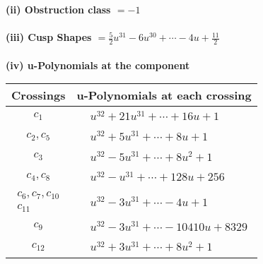 \documentclass[1p]{elsarticle_modified}
\theoremstyle{definition}
\begin{document}
\flushleft \textbf{(ii) Obstruction class $= -1$}\\~\\
\flushleft \textbf{(iii) Cusp Shapes $= \frac{5}{2} u^{31}-6 u^{30}+\cdots-4 u+\frac{11}{2}$}\\~\\
\newpage\renewcommand{\arraystretch}{1}
\flushleft \textbf{(iv) u-Polynomials at the component}\newline \\
\begin{tabular}{m{50pt}|m{274pt}}
Crossings & \hspace{64pt}u-Polynomials at each crossing \\
\hline $$\begin{aligned}c_{1}\end{aligned}$$&$\begin{aligned}
&u^{32}+21 u^{31}+\cdots+16 u+1
\end{aligned}$\\
\hline $$\begin{aligned}c_{2},c_{5}\end{aligned}$$&$\begin{aligned}
&u^{32}+5 u^{31}+\cdots+8 u+1
\end{aligned}$\\
\hline $$\begin{aligned}c_{3}\end{aligned}$$&$\begin{aligned}
&u^{32}-5 u^{31}+\cdots+8 u^2+1
\end{aligned}$\\
\hline $$\begin{aligned}c_{4},c_{8}\end{aligned}$$&$\begin{aligned}
&u^{32}- u^{31}+\cdots+128 u+256
\end{aligned}$\\
\hline $$\begin{aligned}c_{6},c_{7},c_{10}\\c_{11}\end{aligned}$$&$\begin{aligned}
&u^{32}-3 u^{31}+\cdots-4 u+1
\end{aligned}$\\
\hline $$\begin{aligned}c_{9}\end{aligned}$$&$\begin{aligned}
&u^{32}-3 u^{31}+\cdots-10410 u+8329
\end{aligned}$\\
\hline $$\begin{aligned}c_{12}\end{aligned}$$&$\begin{aligned}
&u^{32}+3 u^{31}+\cdots+8 u^2+1
\end{aligned}$\\
\hline
\end{tabular}\\~\\
\end{document}
